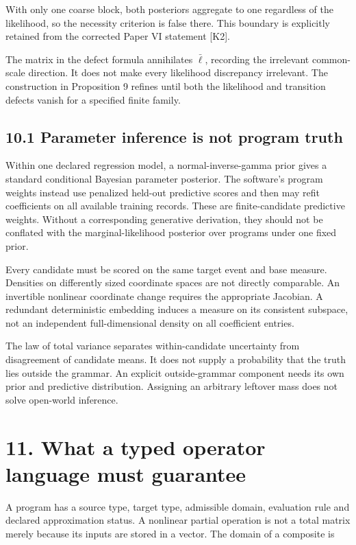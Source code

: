 \documentclass[11pt,letterpaper]{article}
\begin{document}
With only one coarse block, both posteriors aggregate to one regardless
of the likelihood, so the necessity criterion is false there. This
boundary is explicitly retained from the corrected Paper VI statement
{[}K2{]}.

The matrix in the defect formula annihilates \(\bar\ell\), recording the
irrelevant common-scale direction. It does not make every likelihood
discrepancy irrelevant. The construction in Proposition 9 refines until
both the likelihood and transition defects vanish for a specified finite
family.

\subsection{10.1 Parameter inference is not program
truth}\label{parameter-inference-is-not-program-truth}

Within one declared regression model, a normal-inverse-gamma prior gives
a standard conditional Bayesian parameter posterior. The software's
program weights instead use penalized held-out predictive scores and
then may refit coefficients on all available training records. These are
finite-candidate predictive weights. Without a corresponding generative
derivation, they should not be conflated with the marginal-likelihood
posterior over programs under one fixed prior.

Every candidate must be scored on the same target event and base
measure. Densities on differently sized coordinate spaces are not
directly comparable. An invertible nonlinear coordinate change requires
the appropriate Jacobian. A redundant deterministic embedding induces a
measure on its consistent subspace, not an independent full-dimensional
density on all coefficient entries.

The law of total variance separates within-candidate uncertainty from
disagreement of candidate means. It does not supply a probability that
the truth lies outside the grammar. An explicit outside-grammar
component needs its own prior and predictive distribution. Assigning an
arbitrary leftover mass does not solve open-world inference.

\section{11. What a typed operator language must
guarantee}\label{what-a-typed-operator-language-must-guarantee}

A program has a source type, target type, admissible domain, evaluation
rule and declared approximation status. A nonlinear partial operation is
not a total matrix merely because its inputs are stored in a vector. The
domain of a composite is
\end{document}
